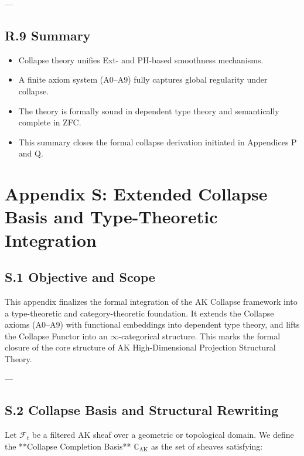 \documentclass[11pt]{article}
\begin{document}
{---

\subsection*{R.9 Summary}

\begin{itemize}
  \item Collapse theory unifies Ext- and PH-based smoothness mechanisms.
  \item A finite axiom system (A0–A9) fully captures global regularity under collapse.
  \item The theory is formally sound in dependent type theory and semantically complete in ZFC.
  \item This summary closes the formal collapse derivation initiated in Appendices P and Q.
\end{itemize}




\section*{Appendix S: Extended Collapse Basis and Type-Theoretic Integration}

\subsection*{S.1 Objective and Scope}

This appendix finalizes the formal integration of the AK Collapse framework into a type-theoretic and category-theoretic foundation.  
It extends the Collapse axioms (A0–A9) with functional embeddings into dependent type theory, and lifts the Collapse Functor into an $\infty$-categorical structure.  
This marks the formal closure of the core structure of AK High-Dimensional Projection Structural Theory.

---

\subsection*{S.2 Collapse Basis and Structural Rewriting}

Let $\mathcal{F}_t$ be a filtered AK sheaf over a geometric or topological domain.  
We define the **Collapse Completion Basis** $\mathbb{C}_{\mathrm{AK}}$ as the set of sheaves satisfying:

}
\end{document}
